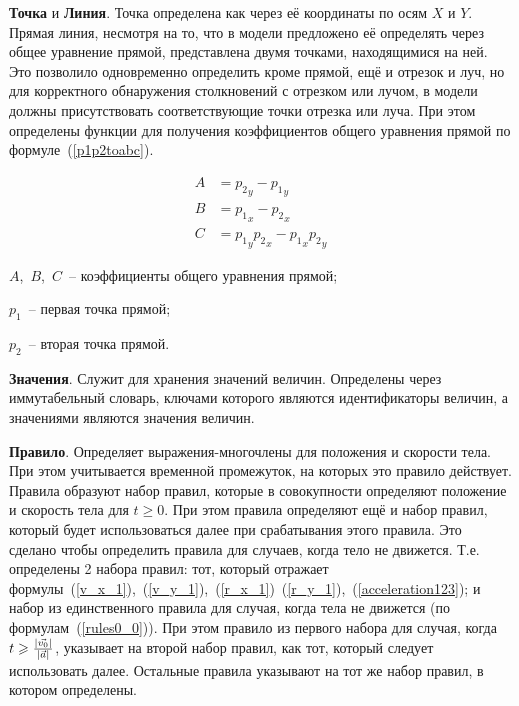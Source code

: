 \textbf{Точка} и \textbf{Линия}.\label{pointlinedescr} Точка определена как через её координаты по осям \(X\) и \(Y\).
Прямая линия, несмотря на то, что в модели предложено её определять через общее уравнение прямой, представлена двумя точками, находящимися на ней.
Это позволило одновременно определить кроме прямой, ещё и отрезок и луч, но для корректного обнаружения столкновений с отрезком или лучом,
в модели должны присутствовать соответствующие точки отрезка или луча.
При этом определены функции для получения коэффициентов общего уравнения прямой по формуле~(\ref{p1p2toabc}).

\begin{align}\label{p1p2toabc}
    A & = {p_2}_y - {p_1}_y \nonumber                  \\
    B & = {p_1}_x - {p_2}_x                            \\
    C & = {p_1}_y {p_2}_x - {p_1}_x {p_2}_y  \nonumber
\end{align}

\begin{Underequation}
    \(A\),~\(B\),~\(C\)~-- коэффициенты общего уравнения прямой;

    \(p_1\)~-- первая точка прямой;

    \(p_2\)~-- вторая точка прямой.
\end{Underequation}

\textbf{Значения}.\label{valuesdescr}
Служит для хранения значений величин. Определены через иммутабельный словарь, ключами которого являются
идентификаторы величин, а значениями являются значения величин. \TODO

\textbf{Правило}.\label{rulesdescr}
Определяет выражения-многочлены для положения и скорости тела.
При этом учитывается временной промежуток, на которых это правило действует. Правила образуют набор правил,
которые в совокупности определяют положение и скорость тела для \(t \geqslant 0\). При этом правила определяют
ещё и набор правил, который будет использоваться далее при срабатывания этого правила.
Это сделано чтобы определить правила для случаев, когда тело не движется. Т.е. определены 2 набора правил:
тот, который отражает формулы~(\ref{v_x_1}),~(\ref{v_y_1}),~(\ref{r_x_1})~(\ref{r_y_1}),~(\ref{acceleration123});
и набор из единственного правила для случая, когда тела не движется (по формулам~(\ref{rules0_0})).
При этом правило из первого набора для случая, когда \(t \geqslant \frac{\left|\vec{v_0}\right|}{\left|\vec{a}\right|}\),
указывает на второй набор правил, как тот, который следует использовать далее.
Остальные правила указывают на тот же набор правил, в котором определены.

